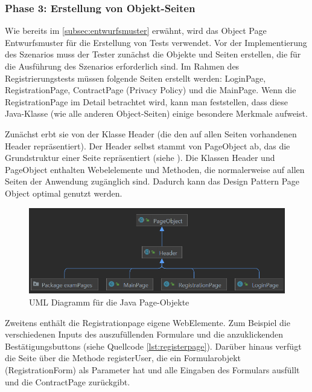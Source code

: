 \subsubsection{Phase 3: Erstellung von Objekt-Seiten}

Wie bereits im \autoref{subsec:entwurfsmuster} erwähnt, wird das Object
Page Entwurfsmuster für die Erstellung von Tests verwendet.
Vor der Implementierung des Szenarios muss der Tester zunächst
die Objekte und Seiten erstellen, die für die Ausführung des Szenarios
erforderlich sind. Im Rahmen des Registrierungstests müssen folgende
Seiten erstellt werden: LoginPage, RegistrationPage, ContractPage
(Privacy Policy) und die MainPage. Wenn die RegistrationPage
im Detail betrachtet wird, kann man feststellen, dass diese
Java-Klasse (wie alle anderen Object-Seiten) einige besondere Merkmale
aufweist.

Zunächst erbt sie von der Klasse Header (die den auf allen Seiten
vorhandenen Header repräsentiert). Der Header selbst stammt von
PageObject ab, das die Grundstruktur einer Seite repräsentiert
(siehe ). Die Klassen Header und PageObject enthalten
Webelelemente und Methoden, die normalerweise auf allen Seiten der
Anwendung zugänglich sind. Dadurch kann das Design Pattern Page
Object optimal genutzt werden.

\begin{figure}[H]
    \centering
    \includegraphics[scale=0.7]{images/pag-uml}
    \caption{UML Diagramm für die Java Page-Objekte} \label{fig:pag-uml}
\end{figure}

Zweitens enthält die Registrationpage eigene WebElemente.
Zum Beispiel die verschiedenen Inputs des auszufüllenden Formulare und
die anzuklickenden Bestätigungsbuttons (siehe Quellcode \ref{lst:registerpage}). Darüber hinaus
verfügt die Seite über die Methode registerUser, die ein
Formularobjekt (RegistrationForm) als Parameter hat und alle Eingaben
des Formulars ausfüllt und die ContractPage zurückgibt.

